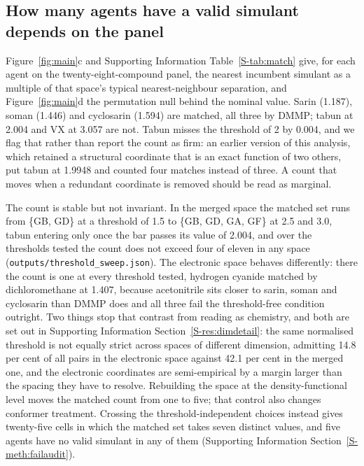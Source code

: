 \documentclass[journal=ancham,manuscript=article,margin=1in]{achemso}
\begin{document}
\subsection{How many agents have a valid simulant depends on the panel}
\label{res:match}

Figure~\ref{fig:main}c and Supporting Information Table~\ref{S-tab:match} give,
for each agent on the twenty-eight-compound panel, the nearest incumbent
simulant as a multiple of that space's typical nearest-neighbour separation,
and Figure~\ref{fig:main}d the permutation null behind the nominal value. Sarin
(1.187), soman (1.446) and cyclosarin (1.594) are matched, all three by DMMP;
tabun at 2.004 and VX at 3.057 are not. Tabun misses the threshold of 2 by
0.004, and we flag that rather than report the count as firm: an earlier version
of this analysis, which retained a structural coordinate that is an exact
function of two others, put tabun at 1.9948 and counted four matches instead of
three. A count that moves when a redundant coordinate is removed should be read
as marginal.

The count is stable but not invariant. In the merged space the matched set runs
from \{GB, GD\} at a threshold of 1.5 to \{GB, GD, GA, GF\} at 2.5 and 3.0, tabun
entering only once the bar passes its value of 2.004, and over the thresholds
tested the count does not exceed four of eleven in any space
(\texttt{outputs/threshold\_sweep.json}). The electronic space behaves
differently: there the count is one at every threshold tested, hydrogen cyanide
matched by dichloromethane at 1.407, because acetonitrile sits closer to sarin,
soman and cyclosarin than DMMP does and all three fail the threshold-free
condition outright. Two things stop that contrast from reading as chemistry, and
both are set out in Supporting Information Section~\ref{S-res:dimdetail}: the
same normalised threshold is not equally strict across spaces of different
dimension, admitting 14.8 per cent of all pairs in the electronic space against
42.1 per cent in the merged one, and the electronic coordinates are
semi-empirical by a margin larger than the spacing they have to resolve.
Rebuilding the space at the density-functional level moves the matched count
from one to five; that control also changes conformer treatment. Crossing the threshold-independent choices instead gives
twenty-five cells in which the matched set takes seven distinct values, and five
agents have no valid simulant in any of them (Supporting Information
Section~\ref{S-meth:failaudit}).
\end{document}
